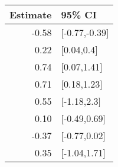 \begin{tabular}{rl}
  \hline
Estimate & 95\% CI \\ 
  \hline
-0.58 & [-0.77,-0.39] \\ 
  0.22 & [0.04,0.4] \\ 
  0.74 & [0.07,1.41] \\ 
  0.71 & [0.18,1.23] \\ 
  0.55 & [-1.18,2.3] \\ 
  0.10 & [-0.49,0.69] \\ 
  -0.37 & [-0.77,0.02] \\ 
  0.35 & [-1.04,1.71] \\ 
   \hline
\end{tabular}

